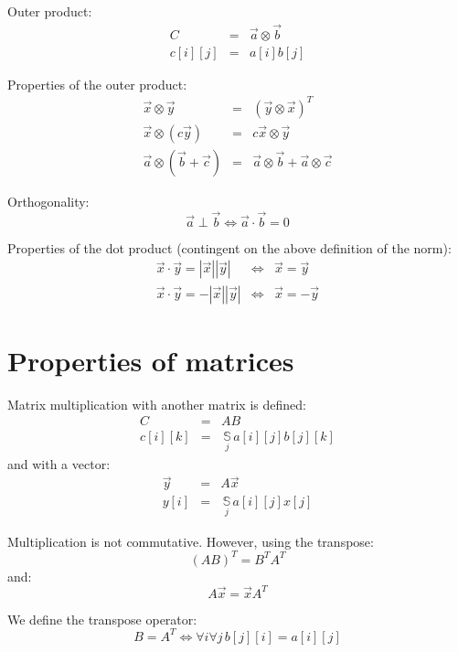 \documentclass{article}
\newcommand{\inner}{\cdot}
\renewcommand{\outer}{\otimes}
\newcommand{\summation}[1]{\underset{#1}{\,\mathbb{S}\,}}
\begin{document}
Outer product:
\begin{eqnarray}
	C & = & \vec a \outer \vec b \\
	c[i][j] & = & a[i] b[j]
\end{eqnarray}

Properties of the outer product:
\begin{eqnarray}
	\vec x \outer \vec y & = & (\vec y \outer \vec x)^T \\
	\vec x \outer (c \vec y) & = & c \vec x \outer \vec y \\
	\vec a \outer (\vec b + \vec c) & = & \vec a \outer \vec b + \vec a \outer \vec c
\end{eqnarray}

Orthogonality:
\begin{equation}
	\vec a \perp \vec b \iff \vec a \inner \vec b = 0
\end{equation}

Properties of the dot product (contingent on the above definition of the norm):
\begin{eqnarray}
	\vec x \inner \vec y = | \vec x | | \vec y | & \iff & \vec x = \vec y \\
	\vec x \inner \vec y = - | \vec x | | \vec y | & \iff & \vec x = - \vec y 
\end{eqnarray}

\section{Properties of matrices}

Matrix multiplication with another matrix is defined:
\begin{eqnarray}
	C & = & A B \\
	c[i][k] & = & \summation{j} a[i][j] b[j][k]
\end{eqnarray}
and with a vector:
\begin{eqnarray}
	\vec y & = & A \vec x \\
	y[i] & = & \summation{j} a[i][j] x[j]
\end{eqnarray}

Multiplication is not commutative.
However, using the transpose:
\begin{equation}
	(AB)^T = B^T A^T
\end{equation}
and:
\begin{equation}
	A \vec x = \vec x A^T
\end{equation}

We define the transpose operator:
\begin{equation}
	B = A^T \iff \forall i \forall j \, b[j][i] = a[i][j]
\end{equation}
\end{document}
